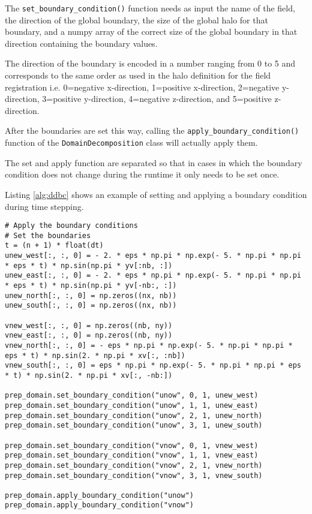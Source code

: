 The \texttt{set\_boundary\_condition()} function needs as input the name of the field, the direction of the global boundary, the size of the global halo for that boundary, and a numpy array of the correct size of the global boundary in that direction containing the boundary values.

The direction of the boundary is encoded in a number ranging from 0 to 5 and corresponds to the same order as used in the halo definition for the field registration i.e. 0=negative x-direction, 1=positive x-direction, 2=negative y-direction, 3=positive y-direction, 4=negative z-direction, and 5=positive z-direction.

After the boundaries are set this way, calling the \texttt{apply\_boundary\_condition()} function of the \texttt{DomainDecomposition} class will actually apply them.

The set and apply function are separated so that in cases in which the boundary condition does not change during the runtime it only needs to be set once.

Listing \ref{alg:ddbc} shows an example of setting and applying a boundary condition during time stepping.

\begin{lstlisting}[caption={Example code of handling the global boundary condition.},captionpos=b, label={alg:ddbc}, float, floatplacement=H]
# Apply the boundary conditions
# Set the boundaries
t = (n + 1) * float(dt)
unew_west[:, :, 0] = - 2. * eps * np.pi * np.exp(- 5. * np.pi * np.pi * eps * t) * np.sin(np.pi * yv[:nb, :])
unew_east[:, :, 0] = - 2. * eps * np.pi * np.exp(- 5. * np.pi * np.pi * eps * t) * np.sin(np.pi * yv[-nb:, :])
unew_north[:, :, 0] = np.zeros((nx, nb))
unew_south[:, :, 0] = np.zeros((nx, nb))

vnew_west[:, :, 0] = np.zeros((nb, ny))
vnew_east[:, :, 0] = np.zeros((nb, ny))
vnew_north[:, :, 0] = - eps * np.pi * np.exp(- 5. * np.pi * np.pi * eps * t) * np.sin(2. * np.pi * xv[:, :nb])
vnew_south[:, :, 0] = eps * np.pi * np.exp(- 5. * np.pi * np.pi * eps * t) * np.sin(2. * np.pi * xv[:, -nb:])

prep_domain.set_boundary_condition("unow", 0, 1, unew_west)
prep_domain.set_boundary_condition("unow", 1, 1, unew_east)
prep_domain.set_boundary_condition("unow", 2, 1, unew_north)
prep_domain.set_boundary_condition("unow", 3, 1, unew_south)

prep_domain.set_boundary_condition("vnow", 0, 1, vnew_west)
prep_domain.set_boundary_condition("vnow", 1, 1, vnew_east)
prep_domain.set_boundary_condition("vnow", 2, 1, vnew_north)
prep_domain.set_boundary_condition("vnow", 3, 1, vnew_south)

prep_domain.apply_boundary_condition("unow")
prep_domain.apply_boundary_condition("vnow")
\end{lstlisting}

